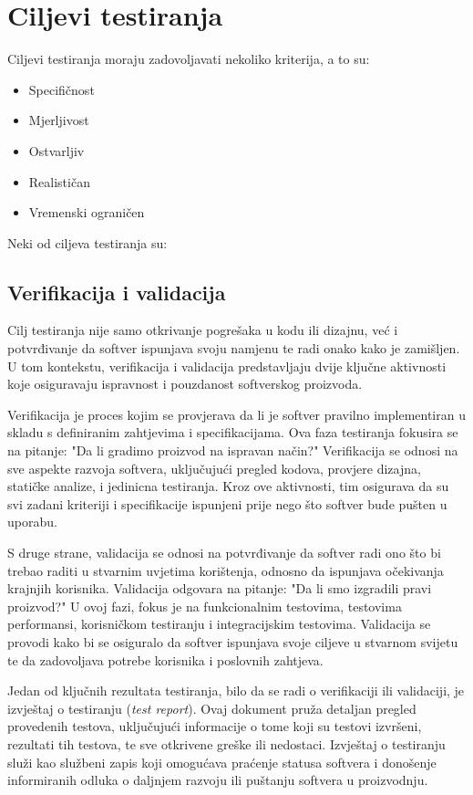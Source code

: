 \section{Ciljevi testiranja}
Ciljevi testiranja moraju zadovoljavati nekoliko kriterija, a to su:
\begin{itemize}
\item Specifičnost
\item Mjerljivost
\item Ostvarljiv
\item Realističan
\item Vremenski ograničen
\end{itemize}

Neki od ciljeva testiranja su: \cite{quadri2010software}
\subsection*{Verifikacija i validacija}
Cilj testiranja nije samo otkrivanje pogrešaka u kodu ili dizajnu, već i potvrđivanje da softver ispunjava svoju namjenu te radi onako kako je zamišljen.
U tom kontekstu, verifikacija i validacija predstavljaju dvije ključne aktivnosti koje osiguravaju ispravnost i pouzdanost softverskog proizvoda.

Verifikacija je proces kojim se provjerava da li je softver pravilno implementiran u skladu s definiranim zahtjevima i specifikacijama.
Ova faza testiranja fokusira se na pitanje: "Da li gradimo proizvod na ispravan način?" Verifikacija se odnosi na sve aspekte razvoja softvera, uključujući pregled kodova, provjere dizajna, statičke analize, i jedinicna testiranja.
Kroz ove aktivnosti, tim osigurava da su svi zadani kriteriji i specifikacije ispunjeni prije nego što softver bude pušten u uporabu.

S druge strane, validacija se odnosi na potvrđivanje da softver radi ono što bi trebao raditi u stvarnim uvjetima korištenja, odnosno da ispunjava očekivanja krajnjih korisnika.
Validacija odgovara na pitanje: "Da li smo izgradili pravi proizvod?" U ovoj fazi, fokus je na funkcionalnim testovima, testovima performansi, korisničkom testiranju i integracijskim testovima.
Validacija se provodi kako bi se osiguralo da softver ispunjava svoje ciljeve u stvarnom svijetu te da zadovoljava potrebe korisnika i poslovnih zahtjeva.

Jedan od ključnih rezultata testiranja, bilo da se radi o verifikaciji ili validaciji, je izvještaj o testiranju (\textit{test report}).
Ovaj dokument pruža detaljan pregled provedenih testova, uključujući informacije o tome koji su testovi izvršeni, rezultati tih testova, te sve otkrivene greške ili nedostaci.
Izvještaj o testiranju služi kao službeni zapis koji omogućava praćenje statusa softvera i donošenje informiranih odluka o daljnjem razvoju ili puštanju softvera u proizvodnju.

